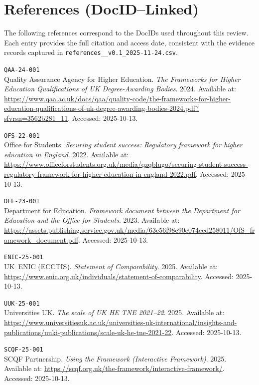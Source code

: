\section{References (DocID--Linked)}

The following references correspond to the DocIDs used throughout this review. Each entry
provides the full citation and access date, consistent with the evidence records captured in
\texttt{references\_\_v0.1\_2025-11-24.csv}.

\begingroup
\sloppy
\setlength{\parindent}{0pt}
\setlength{\parskip}{6pt}

\texttt{QAA-24-001} \\
Quality Assurance Agency for Higher Education. \textit{The Frameworks for Higher Education
Qualifications of UK Degree-Awarding Bodies}. 2024. Available at: 
\url{https://www.qaa.ac.uk/docs/qaa/quality-code/the-frameworks-for-higher-education-qualifications-of-uk-degree-awarding-bodies-2024.pdf?sfvrsn=3562b281_11}. 
Accessed: 2025-10-13.

\texttt{OFS-22-001} \\
Office for Students. \textit{Securing student success: Regulatory framework for higher education
in England}. 2022. Available at: 
\url{https://www.officeforstudents.org.uk/media/qzqblugo/securing-student-success-regulatory-framework-for-higher-education-in-england-2022.pdf}. 
Accessed: 2025-10-13.

\texttt{DFE-23-001} \\
Department for Education. \textit{Framework document between the Department for Education and the
Office for Students}. 2023. Available at: 
\url{https://assets.publishing.service.gov.uk/media/63c56f98e90e074eed258011/OfS_framework_document.pdf}. 
Accessed: 2025-10-13.

\texttt{ENIC-25-001} \\
UK~ENIC (ECCTIS). \textit{Statement of Comparability}. 2025. Available at:
\url{https://www.enic.org.uk/individuals/statement-of-comparability}. 
Accessed: 2025-10-13.

\texttt{UUK-25-001} \\
Universities UK. \textit{The scale of UK HE TNE 2021–22}. 2025. Available at:
\url{https://www.universitiesuk.ac.uk/universities-uk-international/insights-and-publications/uuki-publications/scale-uk-he-tne-2021-22}. 
Accessed: 2025-10-13.

\texttt{SCQF-25-001} \\
SCQF Partnership. \textit{Using the Framework (Interactive Framework)}. 2025. Available at:
\url{https://scqf.org.uk/the-framework/interactive-framework/}. 
Accessed: 2025-10-13.

